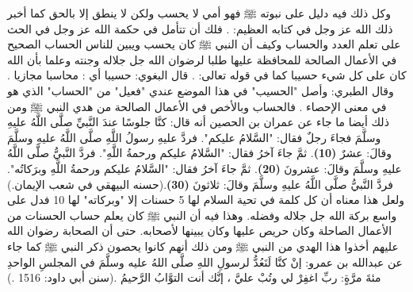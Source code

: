 وكل ذلك فيه دليل على نبوته ﷺ فهو أمي لا يحسب ولكن لا ينطق إلا بالحق كما أخبر ذلك الله عز وجل في كتابه العظيم: \quranayah*[53][3-4]{\footnotesize \surahname*[53]}. فلك أن تتأمل في حكمة الله عز وجل في الحث على تعلم العدد والحساب وكيف أن النبي ﷺ كان يحسب ويبين للناس الحساب الصحيح في الأعمال الصالحة للمحافظة عليها طلبا لرضوان الله جل جلاله وجنته وعلما بأن الله كان على كل شيء حسيبا كما في قوله تعالى: \quranayah*[4][86]{\footnotesize \surahname*[4]}. قال البغوي: حسيبا أي : محاسبا مجازيا \cite{tafsir_Baghawi}. وقال الطبري: وأصل "الحسيب" في هذا الموضع عندي "فعيل" من "الحساب" الذي هو في معنى الإحصاء \cite{tafsir_Tabari}. فالحساب وبالأخص في الأعمال الصالحة من هدي النبي ﷺ ومن ذلك أيضا ما جاء عن عمران بن الحصين أنه قال: كنَّا جلوسًا عندَ النَّبيِّ صلَّى اللَّهُ عليهِ وسلَّمَ فجاءَ رجلٌ فقال: "السَّلامُ عليكم". فردَّ عليهِ رسولُ اللَّهِ صلَّى اللَّهُ عليهِ وسلَّمَ وقالَ: عشرٌ \textbf{\small(10)}. ثمَّ جاءَ آخرُ فقال: "السَّلامُ عليكم ورحمةُ اللَّهِ". فردَّ النَّبيُّ صلَّى اللَّهُ عليهِ وسلَّمَ وقالَ: عشرونَ \textbf{\small(20)}. ثمَّ جاءَ آخرُ فقال: "السَّلامُ عليكم ورحمةُ اللَّهِ وبرَكاتُه". فردَّ النَّبيُّ صلَّى اللَّهُ عليهِ وسلَّمَ وقالَ: ثلاثونَ \textbf{\small(30)}.{\footnotesize (حسنه البيهقي في شعب الإيمان.)} ولعل هذا معناه أن كل كلمة في تحية السلام لها 5 حسنات إلا "وبركاته" لها 10 فدل على واسع بركة الله جل جلاله وفضله. وهذا فيه أن النبي ﷺ كان يعلم حساب الحسنات من الأعمال الصاحلة وكان حريص عليها وكان يبينها لأصحابه. حتى أن الصحابة رضوان الله عليهم أخذوا هذا الهدي من النبي ﷺ ومن ذلك أنهم  كانوا يحصون ذكر النبي ﷺ كما جاء عن عبدالله بن عمرو: إنْ كنَّا لَنَعُدُّ لرسولِ اللهِ صلَّى اللهُ عليه وسلَّمَ في المجلسِ الواحدِ مئةَ مرَّةٍ: ربِّ اغفِرْ لي وتُبْ عليَّ ، إنَّك أنت التوَّابُ الرَّحيمُ \href{https://shamela.ws/book/117359/1248#p1}{\faExternalLink} \cite{SunanAbiDawood}.{\footnotesize (سنن أبي داود: 1516 .)}


